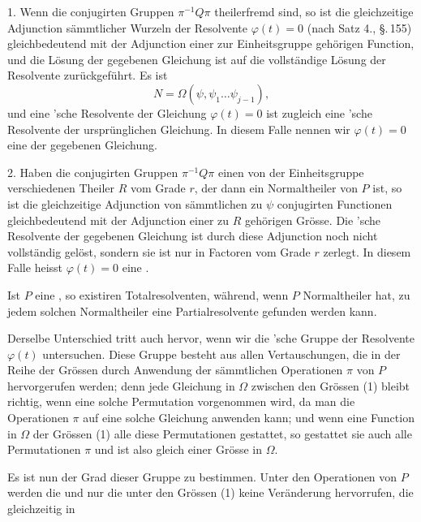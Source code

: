 
1. Wenn die conjugirten Gruppen $\pi^{-1}Q\pi$ theilerfremd sind,
so ist die gleichzeitige Adjunction s\"ammtlicher Wurzeln der
Resolvente $\varphi(t) = 0$ (nach Satz 4., \S.\,155) gleichbedeutend mit
der Adjunction einer zur Einheitsgruppe geh\"origen Function,
und die L\"osung der gegebenen Gleichung ist auf die vollst\"andige
L\"osung der Resolvente zur\"uckgef\"uhrt. Es ist
\[ N = \Omega(\psi, \psi_1 \ldots \psi_{j-1}), \]
und eine 'sche Resolvente der Gleichung $\varphi(t) = 0$ ist
zugleich eine 'sche Resolvente der urspr\"unglichen Gleichung.
In diesem Falle nennen wir $\varphi(t) = 0$ eine 
der gegebenen Gleichung.

2. Haben die conjugirten Gruppen $\pi^{-1}Q\pi$ einen von der
Einheitsgruppe verschiedenen Theiler $R$ vom Grade $r$, der dann
ein Normaltheiler von $P$ ist, so ist die gleichzeitige Adjunction
von s\"ammtlichen zu $\psi$ conjugirten Functionen gleichbedeutend
mit der Adjunction einer zu $R$ geh\"origen Gr\"osse. Die 'sche
Resolvente der gegebenen Gleichung ist durch diese Adjunction
noch nicht vollst\"andig gel\"ost, sondern sie ist nur in Factoren
vom Grade $r$ zerlegt. In diesem Falle heisst $\varphi(t) = 0$ eine
.

Ist $P$ eine , so existiren  Totalresolventen,
w\"ahrend, wenn $P$ Normaltheiler hat, zu jedem
solchen Normaltheiler eine Partialresolvente gefunden werden
kann.

Derselbe Unterschied tritt auch hervor, wenn wir die
'sche Gruppe der Resolvente $\varphi(t)$ untersuchen. Diese
Gruppe besteht aus allen Vertauschungen, die in der Reihe der
Gr\"ossen
durch Anwendung der s\"ammtlichen Operationen $\pi$ von $P$ hervorgerufen werden; denn jede Gleichung in $\Omega$ zwischen den Gr\"ossen (1)
bleibt richtig, wenn eine solche Permutation vorgenommen wird,
da man die Operationen $\pi$ auf eine solche Gleichung anwenden
kann; und wenn eine Function in $\Omega$ der Gr\"ossen (1) alle diese
Permutationen gestattet, so gestattet sie auch alle Permutationen $\pi$
und ist also gleich einer Gr\"osse in $\Omega$.

Es ist nun der Grad dieser Gruppe zu bestimmen. Unter
den Operationen von $P$ werden die und nur die unter den
Gr\"ossen (1) keine Ver\"anderung hervorrufen, die gleichzeitig in
